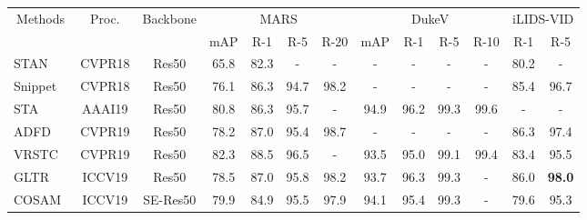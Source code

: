 \documentclass[10pt,twocolumn,letterpaper]{article}
\begin{document}
\begin{table*}[t]
	\centering
	\renewcommand*{\arraystretch}{1.05}
	\small
	\begin{tabular}{@{}lcccccccccccc@{}}
	\toprule[1.5pt]
	\multicolumn{1}{c}{\multirow{2}{*}{Methods}} & \multirow{2}{*}{Proc.} & \multirow{2}{*}{Backbone} & \multicolumn{4}{c}{MARS} & \multicolumn{4}{c}{DukeV} & \multicolumn{2}{c}{iLIDS-VID}  \\ \cmidrule(l){4-13} 
	\multicolumn{1}{c}{} &  &  & mAP & R-1 & R-5 & \multicolumn{1}{c|}{R-20} & mAP & R-1 & R-5 & \multicolumn{1}{c|}{R-10} & R-1 & \multicolumn{1}{c}{R-5}  \\ \midrule
\multicolumn{1}{l|}{STAN~\cite{li2018diversity}} & \multicolumn{1}{c|}{CVPR18} & \multicolumn{1}{c|}{Res50} & 65.8 & 82.3 & - & \multicolumn{1}{c|}{-} & - & - & - & \multicolumn{1}{c|}{-} & 80.2 & \multicolumn{1}{c}{-}  \\
	\multicolumn{1}{l|}{Snippet~\cite{chen2018video}} & \multicolumn{1}{c|}{CVPR18} & \multicolumn{1}{c|}{Res50} & 76.1 & 86.3 & 94.7 & \multicolumn{1}{c|}{98.2} & - & - & - & \multicolumn{1}{c|}{-} & 85.4 & \multicolumn{1}{c}{96.7} \\
	\multicolumn{1}{l|}{STA~\cite{fu2019sta}} & \multicolumn{1}{c|}{AAAI19} & \multicolumn{1}{c|}{Res50} & 80.8 & 86.3 & 95.7 & \multicolumn{1}{c|}{-} & 94.9 & 96.2  & 99.3  & \multicolumn{1}{c|}{99.6} & - & \multicolumn{1}{c}{-}  \\
	\multicolumn{1}{l|}{ADFD~\cite{zhao2019attribute}} & \multicolumn{1}{c|}{CVPR19} & \multicolumn{1}{c|}{Res50} & 78.2 & 87.0 & 95.4 & \multicolumn{1}{c|}{98.7} & - & - & - & \multicolumn{1}{c|}{-} & 86.3 & \multicolumn{1}{c}{97.4}  \\
	\multicolumn{1}{l|}{VRSTC~\cite{hou2019vrstc}} & \multicolumn{1}{c|}{CVPR19} & \multicolumn{1}{c|}{Res50} & 82.3 & 88.5 & 96.5 & \multicolumn{1}{c|}{-} & 93.5 & 95.0  & 99.1  & \multicolumn{1}{c|}{99.4} & 83.4 & \multicolumn{1}{c}{95.5}  \\
	\multicolumn{1}{l|}{GLTR~\cite{li2019global}} & \multicolumn{1}{c|}{ICCV19} & \multicolumn{1}{c|}{Res50} & 78.5 & 87.0 & 95.8 & \multicolumn{1}{c|}{98.2} & 93.7 & 96.3 & 99.3  & \multicolumn{1}{c|}{-} & 86.0 & \multicolumn{1}{c}{\textbf{98.0}}  \\
	\multicolumn{1}{l|}{COSAM~\cite{subramaniam2019co}} & \multicolumn{1}{c|}{ICCV19} & \multicolumn{1}{c|}{SE-Res50} & 79.9 & 84.9 & 95.5 & \multicolumn{1}{c|}{97.9} & 94.1 & 95.4  &  99.3 & \multicolumn{1}{c|}{-} & 79.6 & \multicolumn{1}{c}{95.3}  \\

\end{tabular}
\end{table*}
\end{document}
